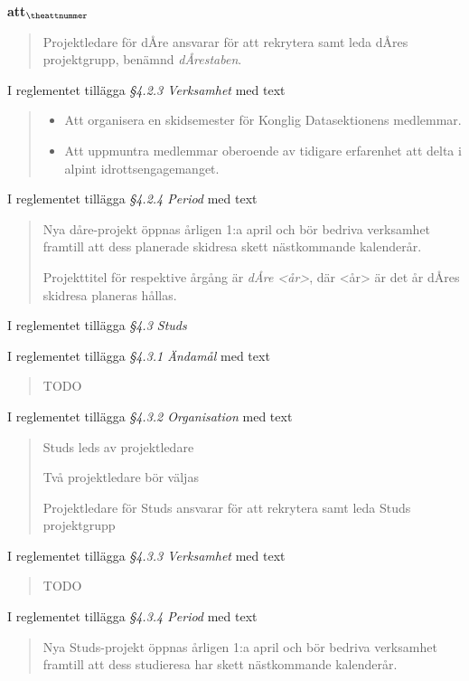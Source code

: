 \documentclass[a4paper]{article}
\begin{document}
\begin{list}{\bf att$_{\theattnummer}$}{}
\begin{quote}
        Projektledare för dÅre ansvarar för att rekrytera samt leda dÅres projektgrupp, benämnd \textit{dÅrestaben}.
    \end{quote}
\item I reglementet tillägga \textit{\S4.2.3 Verksamhet} med text
    \begin{quote}
        \begin{itemize}
            \item Att organisera en skidsemester för Konglig Datasektionens medlemmar.
            \item Att uppmuntra medlemmar oberoende av tidigare erfarenhet att delta i alpint idrottsengagemanget.
        \end{itemize}
    \end{quote}
\item I reglementet tillägga \textit{\S4.2.4 Period} med text
    \begin{quote}
        Nya dåre-projekt öppnas årligen 1:a april och bör bedriva verksamhet framtill att dess planerade skidresa skett nästkommande kalenderår.

        Projekttitel för respektive årgång är \textit{dÅre <år>}, där <år> är det år dÅres skidresa planeras hållas.
    \end{quote}


\item I reglementet tillägga \textit{\S4.3 Studs}
\item I reglementet tillägga \textit{\S4.3.1 Ändamål} med text \begin{quote} TODO \end{quote}
\item I reglementet tillägga \textit{\S4.3.2 Organisation} med text
    \begin{quote}
        Studs leds av projektledare

        Två projektledare bör väljas

        Projektledare för Studs ansvarar för att rekrytera samt leda Studs projektgrupp
    \end{quote}
\item I reglementet tillägga \textit{\S4.3.3 Verksamhet} med text
    \begin{quote}
        TODO
    \end{quote}
\item I reglementet tillägga \textit{\S4.3.4 Period} med text
    \begin{quote}
        Nya Studs-projekt öppnas årligen 1:a april och bör bedriva verksamhet framtill att dess studieresa har skett nästkommande kalenderår.


\end{quote}
\end{list}
\end{document}
